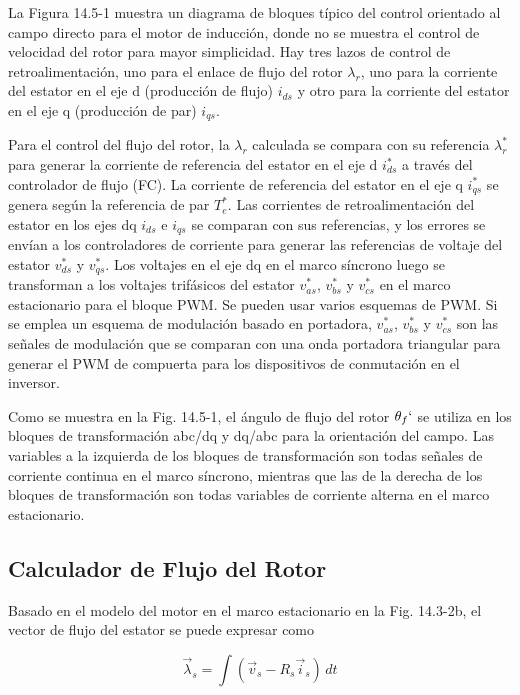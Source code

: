 \documentclass[letterpaper,12pt]{article}
\begin{document}
La Figura 14.5-1 muestra un diagrama de bloques típico del control orientado al campo directo para el motor de inducción, donde no se muestra el control de velocidad del rotor para mayor simplicidad. Hay tres lazos de control de retroalimentación, uno para el enlace de flujo del rotor $\lambda_r$, uno para la corriente del estator en el eje d (producción de flujo) $i_{ds}$ y otro para la corriente del estator en el eje q (producción de par) $i_{qs}$.

Para el control del flujo del rotor, la $\lambda_r$ calculada se compara con su referencia $\lambda_r^*$ para generar la corriente de referencia del estator en el eje d $i_{ds}^*$ a través del controlador de flujo (FC). La corriente de referencia del estator en el eje q $i_{qs}^*$ se genera según la referencia de par $T_e^*$. Las corrientes de retroalimentación del estator en los ejes dq $i_{ds}$ e $i_{qs}$ se comparan con sus referencias, y los errores se envían a los controladores de corriente para generar las referencias de voltaje del estator $v_{ds}^*$ y $v_{qs}^*$. Los voltajes en el eje dq en el marco síncrono luego se transforman a los voltajes trifásicos del estator $v_{as}^*$, $v_{bs}^*$ y $v_{cs}^*$ en el marco estacionario para el bloque PWM. Se pueden usar varios esquemas de PWM. Si se emplea un esquema de modulación basado en portadora, $v_{as}^*$, $v_{bs}^*$ y $v_{cs}^*$ son las señales de modulación que se comparan con una onda portadora triangular para generar el PWM de compuerta para los dispositivos de conmutación en el inversor.

Como se muestra en la Fig. 14.5-1, el ángulo de flujo del rotor $\theta_f`$ se utiliza en los bloques de transformación abc/dq y dq/abc para la orientación del campo. Las variables a la izquierda de los bloques de transformación son todas señales de corriente continua en el marco síncrono, mientras que las de la derecha de los bloques de transformación son todas variables de corriente alterna en el marco estacionario.

\clearpage
\subsection{Calculador de Flujo del Rotor}

Basado en el modelo del motor en el marco estacionario en la Fig. 14.3-2b, el vector de flujo del estator se puede expresar como

\begin{equation}
\vec{\lambda}_s = \int (\vec{v}_s - R_s \vec{i}_s) \, dt \tag{14.5-1}
\end{equation}
\end{document}
